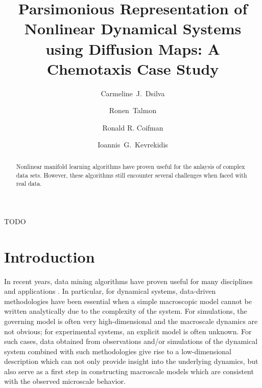 \documentclass[preprint]{elsarticle}
\begin{document}
\begin{frontmatter}

\title{Parsimonious Representation of Nonlinear Dynamical Systems using Diffusion Maps: A Chemotaxis Case Study}

\author[princeton]{Carmeline~J.~Dsilva}
%
\author[technion]{Ronen~Talmon}
%
\author[yale]{Ronald R. Coifman}
%
\author[princeton, princetonpacm]{Ioannis~G.~Kevrekidis }
%
\address[princeton]{Department of Chemical and Biological Engineering, Princeton University, Princeton, NJ, 08540, USA}
\address[technion]{Technion - Israel Institute of Technology, Haifa, 3200003, Israel}
\address[yale]{Department of Mathematics, Yale University, New Haven, CT, 06520, USA}
\address[princetonpacm]{Program in Applied and Computational Mathematics, Princeton University, Princeton, NJ, 08540, USA}
%


\begin{abstract}
Nonlinear manifold learning algorithms have proven useful for the anlaysis of complex data sets. 
%
However, these algorithms still encounter several challenges when faced with real data. 
\end{abstract}


\begin{keyword}
TODO
\end{keyword}

\end{frontmatter}


\section{Introduction}

In recent years, data mining algorithms have proven useful for many disciplines and applications \cite{....}. 
%
In particular, for dynamical systems, data-driven methodologies have been essential when a simple macroscopic model cannot be written analytically due to the complexity of the system.
%
For simulations, the governing model is often very high-dimensional and the macroscale dynamics are not obvious; for experimental systems, an explicit model is often unknown. 
%
For such cases, data obtained from observations and/or simulations of the dynamical system combined with such methodologies give rise to a low-dimensional description which can not only provide insight into the underlying dynamics, but also serve as a first step in constructing macroscale models which are consistent with the observed microscale behavior. 
\end{document}
